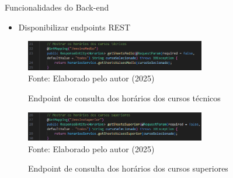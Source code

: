 \begin{frame}{Funcionalidades do Back-end}
    \begin{itemize}
		\item Disponibilizar endpoints REST
	\end{itemize}
    \begin{figure}
        \centering
        \vspace{-0.3cm}
        \caption{Endpoint de consulta dos horários dos cursos técnicos}
        \vspace{-0.2cm}
        \includegraphics[width=0.7\textwidth]{figuras/back-3.png}
        \\ %
        \small Fonte: Elaborado pelo autor (2025)
    \end{figure}
    \begin{figure}
        \centering
        \vspace{-0.5cm}
        \caption{Endpoint de consulta dos horários dos cursos superiores}
        \vspace{-0.2cm}
        \includegraphics[width=0.7\textwidth]{figuras/back-4.png}
        \\ %
        \small Fonte: Elaborado pelo autor (2025)
    \end{figure}
\end{frame}

